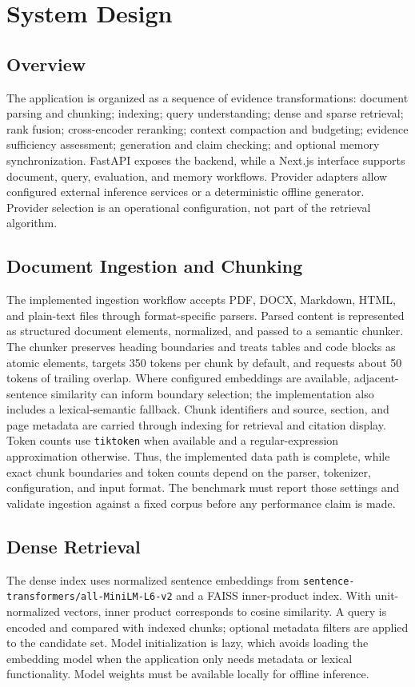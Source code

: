 \documentclass[conference]{IEEEtran}
\begin{document}
\section{System Design}

\subsection{Overview}
The application is organized as a sequence of evidence transformations:
document parsing and chunking; indexing; query understanding; dense and sparse
retrieval; rank fusion; cross-encoder reranking; context compaction and
budgeting; evidence sufficiency assessment; generation and claim checking;
and optional memory synchronization. FastAPI exposes the backend, while a
Next.js interface supports document, query, evaluation, and memory workflows.
Provider adapters allow configured external inference services or a
deterministic offline generator. Provider selection is an operational
configuration, not part of the retrieval algorithm.

\subsection{Document Ingestion and Chunking}
The implemented ingestion workflow accepts PDF, DOCX, Markdown, HTML, and
plain-text files through format-specific parsers. Parsed content is represented
as structured document elements, normalized, and passed to a semantic chunker.
The chunker preserves heading boundaries and treats tables and code blocks as
atomic elements, targets 350 tokens per chunk by default, and requests about
50 tokens of trailing overlap. Where configured embeddings are available,
adjacent-sentence similarity can inform boundary selection; the implementation
also includes a lexical-semantic fallback. Chunk identifiers and source,
section, and page metadata are carried through indexing for retrieval and
citation display. Token counts use \texttt{tiktoken} when available and a
regular-expression approximation otherwise. Thus, the implemented data path is
complete, while exact chunk boundaries and token counts depend on the parser,
tokenizer, configuration, and input format. The benchmark must report those
settings and validate ingestion against a fixed corpus before any performance
claim is made.

\subsection{Dense Retrieval}
The dense index uses normalized sentence embeddings from
\texttt{sentence-transformers/all-MiniLM-L6-v2} and a FAISS inner-product
index. With unit-normalized vectors, inner product corresponds to cosine
similarity. A query is encoded and compared with indexed chunks; optional
metadata filters are applied to the candidate set. Model initialization is
lazy, which avoids loading the embedding model when the application only needs
metadata or lexical functionality. Model weights must be available locally
for offline inference.
\end{document}
